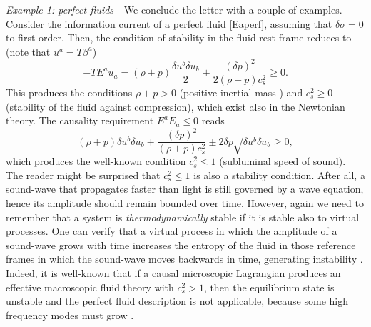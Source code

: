 \documentclass[aps,prl,reprint,nofootinbib]{revtex4-1}
\begin{document}
\textit{Example 1: perfect fluids -} We conclude the letter with a couple of examples. Consider the information current of a perfect fluid \eqref{Eaperf}, assuming that $\delta \sigma=0$ to first order. Then, the condition of stability in the fluid rest frame reduces to (note that $u^a=T\beta^a$) 
\begin{equation}
-TE^a u_a = (\rho+p) \dfrac{\delta u^b \delta u_b}{2} + \dfrac{ (\delta p)^2}{2(\rho+p)c_s^{2}} \geq 0. 
\end{equation}
This produces the conditions $\rho +p >0$ (positive inertial mass \cite{MTW_book}) and $c_s^2 \geq 0$ (stability of the fluid against compression), which exist also in the Newtonian theory. The causality requirement $E^a E_a \leq 0$ reads
\begin{equation}
(\rho +p)\delta u^b \delta u_b + \dfrac{ (\delta p)^2}{(\rho +p)c_s^{2}} \pm 2 \delta p \sqrt{\delta u^b \delta u_b} \geq 0,
\end{equation}
which produces the well-known condition $c_s^2 \leq 1$ (subluminal speed of sound). The reader might be surprised that $c_s^2 \leq 1$ is also a stability condition. After all, a sound-wave that propagates faster than light is still governed by a wave equation, hence its amplitude should remain bounded over time. However, again we need to remember that a system is \textit{thermodynamically} stable if it is stable also to virtual processes.  One can verify that a virtual process in which the amplitude of a sound-wave grows with time increases the entropy of the fluid in those reference frames in which the sound-wave moves backwards in time, generating instability \cite{GavassinoSuper2021}. Indeed, it is well-known that if a causal microscopic Lagrangian produces an effective macroscopic fluid theory with $c_s^2 >1$, then the equilibrium state is unstable and the perfect fluid description is not applicable, because some high frequency modes must grow \cite{Ruderman1968superlum,Susskind1969,BludmanIstab1970}.
\end{document}
